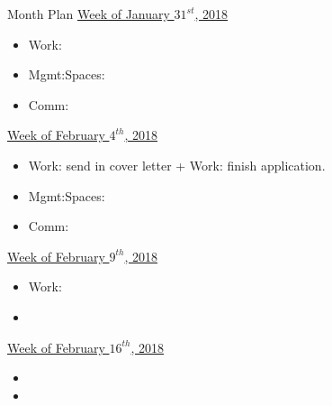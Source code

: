 \begin{columns}
\begin{column}{0.10\linewidth}
\begin{block}{Month Plan}
\underline{Week of January $31^{st}$, 2018}
\begin{itemize}
\tiny \item \tiny Work: 
\item \tiny Mgmt:Spaces: 
\item \tiny Comm: 
\end{itemize}

\underline{Week of February $4^{th}$, 2018}
\begin{itemize}
\tiny \item \tiny Work: send in cover letter + Work: finish application.  
\item \tiny Mgmt:Spaces: 
\item \tiny Comm: 
\end{itemize}

\underline{Week of February $9^{th}$, 2018}
\begin{itemize}
\tiny \item \tiny Work: 
\item \tiny
\end{itemize}

\underline{Week of February $16^{th}$, 2018}
\begin{itemize}
\tiny \item \tiny 
\item \tiny
\end{itemize}
\end{block}


\end{column}
\end{columns}
